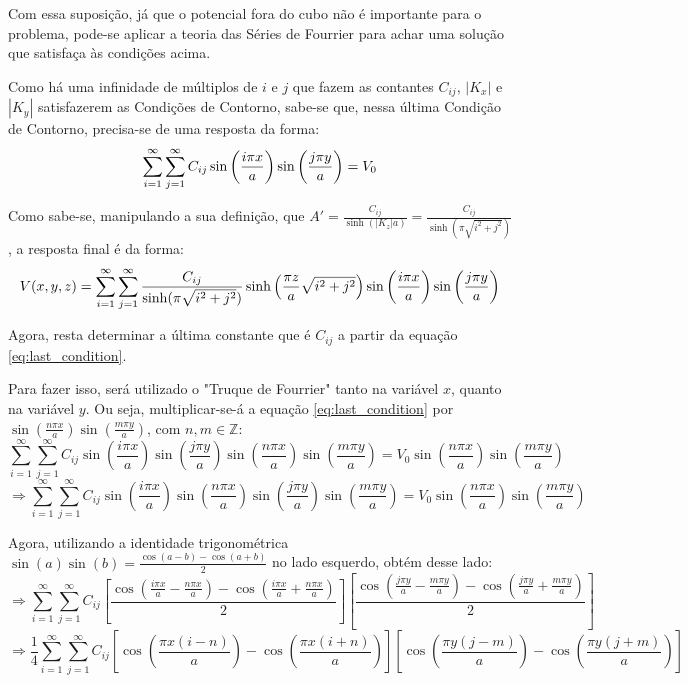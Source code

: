 \documentclass{report}
\begin{document}
Com essa suposição, já que o potencial fora do cubo não é importante para o problema, pode-se
aplicar a teoria das Séries de Fourrier para achar uma solução que satisfaça às condições acima.

Como há uma infinidade de múltiplos de $ i $ e $ j $ que fazem as contantes $ C_{ij} $, $ |K_x| $ e $ |K_y| $ satisfazerem as
Condições de Contorno, sabe-se que, nessa última Condição de Contorno, precisa-se de uma resposta da forma:
\begin{equation}
  \label{eq:last_condition}
  \centering
  \sum_{i=1}^{\infty} \sum_{j=1}^{\infty} C_{ij}\sin\left(\frac{i\pi x}{a}\right)\sin\left(\frac{j\pi y}{a}\right) = V_0
\end{equation}

Como sabe-se, manipulando a sua definição, que $ A' = \frac{C_{ij}}{\sinh(|K_z|a)} = \frac{C_{ij}}{\sinh(\pi\sqrt{i^2 + j^2})} $, a resposta final é da forma:
\begin{equation}
  \label{eq:problem_part2_solution}
  \centering
  V(x, y, z) = \sum_{i=1}^{\infty} \sum_{j=1}^{\infty} \frac{C_{ij}}{\sinh(\pi\sqrt{i^2 + j^2})}\sinh\left(\frac{\pi z}{a}\sqrt{i^2 + j^2}\right)\sin\left(\frac{i\pi x}{a}\right)\sin\left(\frac{j\pi y}{a}\right)
\end{equation}

Agora, resta determinar a última constante que é $ C_{ij} $ a partir da equação \ref{eq:last_condition}.

Para fazer isso, será utilizado o "Truque de Fourrier" tanto na variável $ x $, quanto na variável $ y $. Ou seja, multiplicar-se-á a equação
\ref{eq:last_condition} por $ \sin\left(\frac{n\pi x}{a}\right)\sin\left(\frac{m\pi y}{a}\right) $, com $ n, m \in \mathbb{Z} $:
$$ \sum_{i=1}^{\infty} \sum_{j=1}^{\infty} C_{ij}\sin\left(\frac{i\pi x}{a}\right)\sin\left(\frac{j\pi y}{a}\right)\sin\left(\frac{n\pi x}{a}\right)\sin\left(\frac{m\pi y}{a}\right) = V_0\sin\left(\frac{n\pi x}{a}\right)\sin\left(\frac{m\pi y}{a}\right) $$
$$ \Rightarrow \sum_{i=1}^{\infty} \sum_{j=1}^{\infty} C_{ij}\sin\left(\frac{i\pi x}{a}\right)\sin\left(\frac{n\pi x}{a}\right)\sin\left(\frac{j\pi y}{a}\right)\sin\left(\frac{m\pi y}{a}\right) = V_0\sin\left(\frac{n\pi x}{a}\right)\sin\left(\frac{m\pi y}{a}\right) $$

Agora, utilizando a identidade trigonométrica $ \sin(a)\sin(b) = \frac{\cos(a - b) - \cos(a + b)}{2} $ no lado esquerdo, obtém desse lado:
$$ \Rightarrow \sum_{i=1}^{\infty} \sum_{j=1}^{\infty} C_{ij}\left[\frac{\cos\left(\frac{i\pi x}{a} - \frac{n\pi x}{a}\right) - \cos\left(\frac{i\pi x}{a} + \frac{n\pi x}{a}\right)}{2}\right]\left[\frac{\cos\left(\frac{j\pi y}{a} - \frac{m\pi y}{a}\right) - \cos\left(\frac{j\pi y}{a} + \frac{m\pi y}{a}\right)}{2}\right]$$
$$ \Rightarrow \frac{1}{4}\sum_{i=1}^{\infty} \sum_{j=1}^{\infty} C_{ij}\left[\cos\left(\frac{\pi x(i - n)}{a}\right) - \cos\left(\frac{\pi x(i + n)}{a}\right)\right]\left[\cos\left(\frac{\pi y(j - m)}{a}\right) - \cos\left(\frac{\pi y(j + m)}{a}\right)\right]$$
\end{document}
